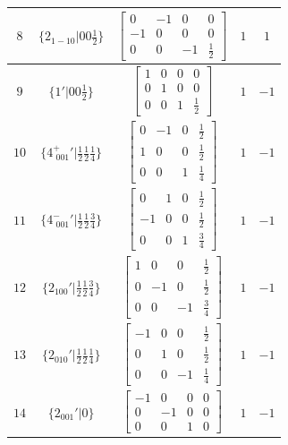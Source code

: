 \documentclass[fleqn,8pt]{jsarticle}
\begin{document}
\begin{longtable}{ccccc}
$ 8 $ & $ \{2{}_{1-10}|0 0 \frac{1}{2}\} $ & $ \begin{bmatrix} 0 & -1 & 0 & 0 \\ -1 & 0 & 0 & 0 \\ 0 & 0 & -1 & \frac{1}{2} \end{bmatrix} $ & $ 1 $ & $ 1 $ \\ \hline
$ 9 $ & $ \{1{}'|0 0 \frac{1}{2}\} $ & $ \begin{bmatrix} 1 & 0 & 0 & 0 \\ 0 & 1 & 0 & 0 \\ 0 & 0 & 1 & \frac{1}{2} \end{bmatrix} $ & $ 1 $ & $ -1 $ \\ \hline
$ 10 $ & $ \{4^{+}_{\,\,001}{}'|\frac{1}{2} \frac{1}{2} \frac{1}{4}\} $ & $ \begin{bmatrix} 0 & -1 & 0 & \frac{1}{2} \\ 1 & 0 & 0 & \frac{1}{2} \\ 0 & 0 & 1 & \frac{1}{4} \end{bmatrix} $ & $ 1 $ & $ -1 $ \\ \hline
$ 11 $ & $ \{4^{-}_{\,\,001}{}'|\frac{1}{2} \frac{1}{2} \frac{3}{4}\} $ & $ \begin{bmatrix} 0 & 1 & 0 & \frac{1}{2} \\ -1 & 0 & 0 & \frac{1}{2} \\ 0 & 0 & 1 & \frac{3}{4} \end{bmatrix} $ & $ 1 $ & $ -1 $ \\ \hline
$ 12 $ & $ \{2{}_{100}{}'|\frac{1}{2} \frac{1}{2} \frac{3}{4}\} $ & $ \begin{bmatrix} 1 & 0 & 0 & \frac{1}{2} \\ 0 & -1 & 0 & \frac{1}{2} \\ 0 & 0 & -1 & \frac{3}{4} \end{bmatrix} $ & $ 1 $ & $ -1 $ \\ \hline
$ 13 $ & $ \{2{}_{010}{}'|\frac{1}{2} \frac{1}{2} \frac{1}{4}\} $ & $ \begin{bmatrix} -1 & 0 & 0 & \frac{1}{2} \\ 0 & 1 & 0 & \frac{1}{2} \\ 0 & 0 & -1 & \frac{1}{4} \end{bmatrix} $ & $ 1 $ & $ -1 $ \\ \hline
$ 14 $ & $ \{2{}_{001}{}'|0\} $ & $ \begin{bmatrix} -1 & 0 & 0 & 0 \\ 0 & -1 & 0 & 0 \\ 0 & 0 & 1 & 0 \end{bmatrix} $ & $ 1 $ & $ -1 $ \\ \hline

\end{longtable}
\end{document}
